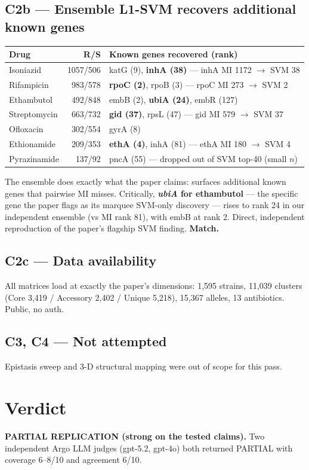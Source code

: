 \documentclass[11pt]{article}
\begin{document}
\subsection{C2b --- Ensemble L1-SVM recovers additional known genes \checkmark}
\begin{center}
\begin{tabular}{lrp{6.5cm}}
\toprule
Drug & R/S & Known genes recovered (rank) \\
\midrule
Isoniazid & 1057/506 & katG (9), \textbf{inhA (38)} --- inhA MI 1172 $\to$ SVM 38 \\
Rifampicin & 983/578 & \textbf{rpoC (2)}, rpoB (3) --- rpoC MI 273 $\to$ SVM 2 \\
Ethambutol & 492/848 & embB (2), \textbf{ubiA (24)}, embR (127) \\
Streptomycin & 663/732 & \textbf{gid (37)}, rpsL (47) --- gid MI 579 $\to$ SVM 37 \\
Ofloxacin & 302/554 & gyrA (8) \\
Ethionamide & 209/353 & \textbf{ethA (4)}, inhA (81) --- ethA MI 180 $\to$ SVM 4 \\
Pyrazinamide & 137/92 & pncA (55) --- dropped out of SVM top-40 (small $n$) \\
\bottomrule
\end{tabular}
\end{center}
The ensemble does exactly what the paper claims: surfaces additional known genes that pairwise MI misses. Critically, \textbf{\textit{ubiA} for ethambutol} --- the specific gene the paper flags as its marquee SVM-only discovery --- rises to rank 24 in our independent ensemble (vs MI rank 81), with embB at rank 2. Direct, independent reproduction of the paper's flagship SVM finding. \textbf{Match.}

\subsection{C2c --- Data availability \checkmark}
All matrices load at exactly the paper's dimensions: 1{,}595 strains, 11{,}039 clusters (Core 3{,}419 / Accessory 2{,}402 / Unique 5{,}218), 15{,}367 alleles, 13 antibiotics. Public, no auth.

\subsection{C3, C4 --- Not attempted}
Epistasis sweep and 3-D structural mapping were out of scope for this pass.

\section{Verdict}
\textbf{PARTIAL REPLICATION (strong on the tested claims).} Two independent Argo LLM judges (gpt-5.2, gpt-4o) both returned PARTIAL with coverage 6--8/10 and agreement 6/10.
\end{document}
